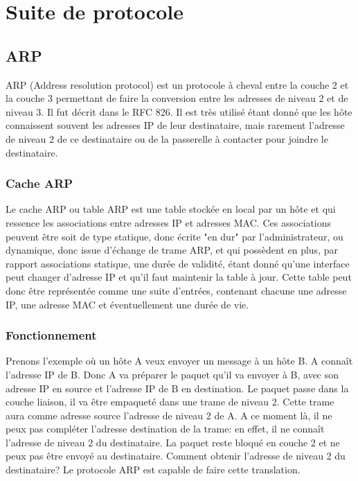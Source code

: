\section{Suite de protocole}
\label{sec:suiteprot}

\subsection{ARP} ARP (Address resolution protocol) est un protocole à cheval
entre la couche 2 et la couche 3 permettant de faire la conversion entre les
adresses de niveau 2 et de niveau 3. Il fut décrit dans le RFC 826\cite{url-RFC-ARP}.
Il est très utilisé étant donné que les hôte connaissent souvent les adresses
IP de leur destinataire, mais rarement l'adresse de niveau 2 de ce destinataire
ou de la passerelle à contacter pour joindre le destinataire.

\subsubsection{Cache ARP} Le cache ARP ou table ARP est une table stockée en
local par un hôte et qui ressence les associations entre adresses IP et adresses
MAC.  Ces associations peuvent être soit de type statique, donc écrite "en dur"
par l'administrateur, ou dynamique, donc issue d'échange de trame ARP, et qui
possèdent en plus, par rapport associations statique, une durée de validité, étant
donné qu'une interface peut changer d'adresse IP et qu'il faut maintenir la
table à jour.  Cette table peut donc être représentée comme une suite d'entrées,
contenant chacune une adresse IP, une adresse MAC et éventuellement une durée
de vie.

\subsubsection{Fonctionnement} Prenons l'exemple où un hôte A veux envoyer un message à
un hôte B. A connaît l'adresse IP de B. Donc A va préparer le paquet qu'il va envoyer
à B, avec son adresse IP en source et l'adresse IP de B en destination. Le
paquet passe dans la couche liaison, il va être empaqueté dans une trame de
niveau 2. Cette trame aura comme adresse source l'adresse de niveau 2 de A.
A ce moment là, il ne peux pas compléter l'adresse destination de la trame: en
effet, il ne connaît l'adresse de niveau 2 du destinataire. La paquet reste
bloqué en couche 2 et ne peux pas être envoyé au destinataire. Comment obtenir
l'adresse de niveau 2 du destinataire?  Le protocole ARP est capable de faire
cette translation.

